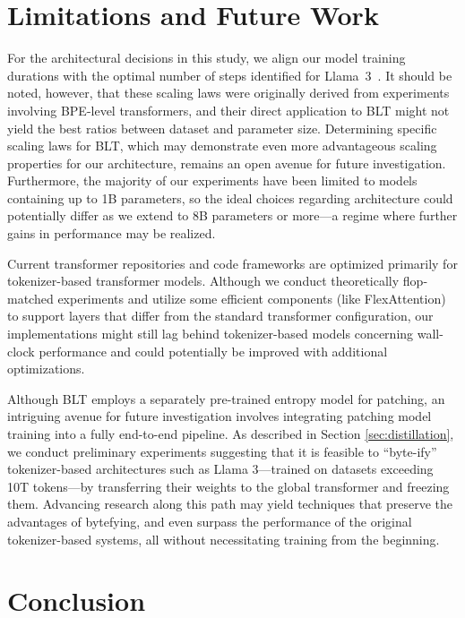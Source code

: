 \section{Limitations and Future Work}

For the architectural decisions in this study, we align our model training durations with the optimal number of steps identified for Llama~3~\citep{dubey2024llama}. It should be noted, however, that these scaling laws were originally derived from experiments involving BPE-level transformers, and their direct application to {\textsc BLT} might not yield the best ratios between dataset and parameter size. Determining specific scaling laws for {\textsc BLT}, which may demonstrate even more advantageous scaling properties for our architecture, remains an open avenue for future investigation. Furthermore, the majority of our experiments have been limited to models containing up to 1B parameters, so the ideal choices regarding architecture could potentially differ as we extend to 8B parameters or more—a regime where further gains in performance may be realized.

Current transformer repositories and code frameworks are optimized primarily for tokenizer-based transformer models. Although we conduct theoretically flop-matched experiments and utilize some efficient components (like FlexAttention) to support layers that differ from the standard transformer configuration, our implementations might still lag behind tokenizer-based models concerning wall-clock performance and could potentially be improved with additional optimizations.

Although {\textsc BLT} employs a separately pre-trained entropy model for patching, an intriguing avenue for future investigation involves integrating patching model training into a fully end-to-end pipeline. As described in Section \ref{sec:distillation}, we conduct preliminary experiments suggesting that it is feasible to ``byte-ify'' tokenizer-based architectures such as Llama 3—trained on datasets exceeding 10T tokens—by transferring their weights to the global transformer and freezing them. Advancing research along this path may yield techniques that preserve the advantages of bytefying, and even surpass the performance of the original tokenizer-based systems, all without necessitating training from the beginning.

\section{Conclusion}
\label{section:conclusion}

